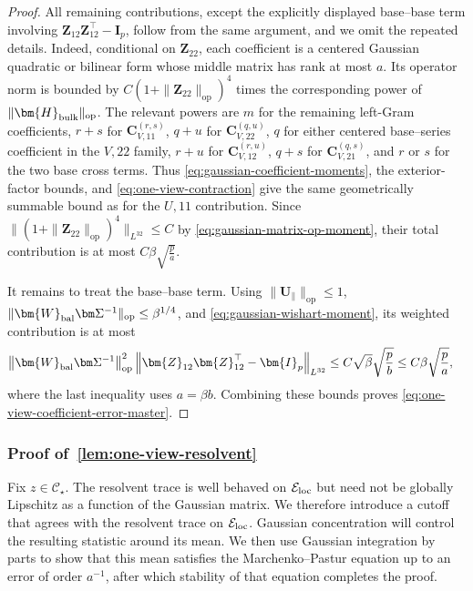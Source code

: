 \documentclass[11pt]{article}
\newcommand{\trans}{\top}
\newcommand{\opn}[1]{\left\lVert #1\right\rVert_{\mathrm{op}}}
\newcommand{\cE}{\mathcal{E}}
\begin{document}
\begin{proof}
All remaining contributions, except the explicitly displayed base--base
term involving $\bm{Z}_{12}\bm{Z}_{12}^\trans-\bm{I}_p$, follow from the same
argument, and we omit the repeated details.  Indeed, conditional on
$\bm{Z}_{22}$, each coefficient is a
centered Gaussian quadratic or bilinear form whose middle matrix has rank
at most $a$.  Its operator norm is bounded by
$C(1+\|\bm{Z}_{22}\|_{\mathrm{op}})^4$ times the corresponding power of $\|\bm{H}_{\rm bulk}\|_{\mathrm{op}}$.
The relevant powers are $m$ for the remaining left-Gram coefficients,
$r+s$ for $\bm{C}_{V,11}^{(r,s)}$,
$q+u$ for $\bm{C}_{V,22}^{(q,u)}$, $q$ for either centered base--series
coefficient in the $V,22$ family, $r+u$ for
$\bm{C}_{V,12}^{(r,u)}$, $q+s$ for $\bm{C}_{V,21}^{(q,s)}$, and $r$ or $s$
for the two base cross terms.
Thus \cref{eq:gaussian-coefficient-moments}, the exterior-factor bounds,
and \cref{eq:one-view-contraction} give the same geometrically summable
bound as for the $U,11$ contribution.  Since
$\|(1+\|\bm{Z}_{22}\|_{\mathrm{op}})^4\|_{L^{32}}\le C$ by
\cref{eq:gaussian-matrix-op-moment}, their total contribution is at most
$C\beta \sqrt{\frac{p}{a}}$.


It remains to treat the base--base term.  Using
$\|\bm{U}_\parallel\|_{\mathrm{op}}\le1$,
$\|\bm{W}_{\rm bal}\bm\Sigma^{-1}\|_{\mathrm{op}}\le\beta^{1/4}$, and
\cref{eq:gaussian-wishart-moment}, its weighted contribution is at most
\begin{align*}
\opn{\bm{W}_{\rm bal}\bm\Sigma^{-1}}^2
\left\|\bm{Z}_{12}\bm{Z}_{12}^\trans-\bm{I}_p\right\|_{L^{32}}
&\le
C\sqrt\beta
\sqrt{\frac pb}\le C\beta \sqrt{\frac{p}{a}},
\end{align*}
where the last inequality uses $a=\beta b$.
Combining these bounds proves
\cref{eq:one-view-coefficient-error-master}.
\end{proof}


\subsubsection{Proof of~\cref{lem:one-view-resolvent}}

Fix $z\in\mathcal C_\star$. The resolvent trace is well behaved on
$\cE_{\rm loc}$ but need not be globally Lipschitz as a function of the
Gaussian matrix. We therefore introduce a cutoff that agrees with the
resolvent trace on $\cE_{\rm loc}$. Gaussian concentration will control the
resulting statistic around its mean. We then use Gaussian integration by
parts to show that this mean satisfies the Marchenko--Pastur equation up to
an error of order $a^{-1}$, after which stability of that equation completes
the proof.
\end{document}
